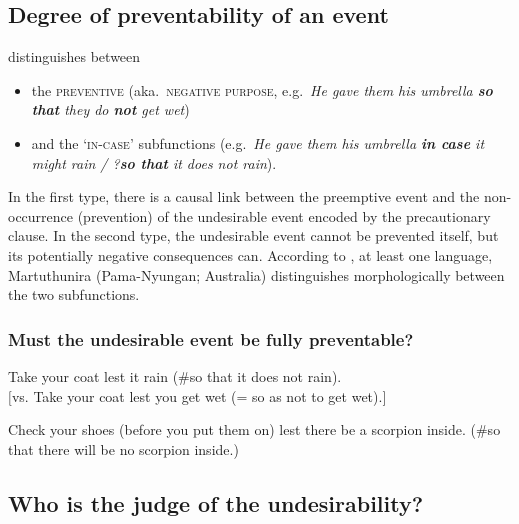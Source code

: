 \documentclass[output=paper,colorlinks,citecolor=brown]{langscibook}
\begin{document}
\subsection{Degree of preventability of an event}
\label{subsec:prepreventability}

\citet[298]{lichtenberk1995} distinguishes between

\begin{itemize}
    \item the \textsc{preventive} (aka.\  \textsc{negative purpose}, e.g.\ \textit{He gave them his umbrella \textbf{so that} they do \textbf{not} get wet})
    \item and the `\textsc{in-case}' subfunctions (e.g.\ \textit{He gave them his umbrella \textbf{in case} it might rain \textnormal{/} ?\textbf{so that} it does not rain}).
\end{itemize}

\noindent In the first type, there is a causal link between the preemptive event and the non-occurrence (prevention) of the undesirable event encoded by the precautionary clause. In the second type, the undesirable event cannot be prevented itself, but its potentially negative consequences can. According to \citet[308]{lichtenberk1995}, at least one language, Martuthunira (Pama-Nyungan; Australia) distinguishes morphologically between the two subfunctions.

\subsubsection{Must the undesirable event be fully preventable?}
\label{2.2.1}

\label{2.2.1.1}

\ea \label{p49} Take your coat lest it rain (\#so that it does not rain). \\
$[$\textnormal{vs.} Take your coat lest you get wet (= so as not to get wet).$]$
\z

\ea \label{p50} Check your shoes (before you put them on) lest there be a scorpion inside. (\#so that there will be no scorpion inside.)
\z



\subsection{Who is the judge of the undesirability?}
\label{subsec:prejudge}
\end{document}

